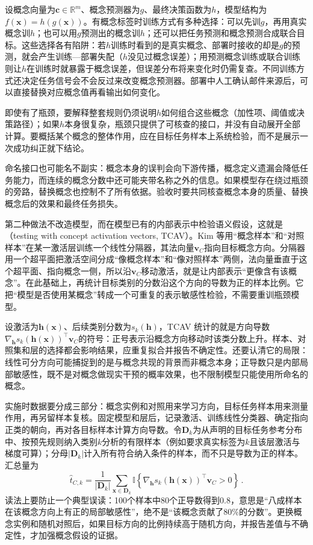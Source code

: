设概念向量为$\bm c\in\mathbb R^m$、概念预测器为$g$、最终决策函数为$h$，模型结构为$f(\bm x)=h(g(\bm x))$。有概念标签时训练方式有多种选择：可以先训$g$，再用真实概念训$h$；也可以用$g$预测出的概念训$h$；还可以把任务预测和概念预测合成联合目标。这些选择各有陷阱：若$h$训练时看到的是真实概念、部署时接收的却是$g$的预测，就会产生训练—部署失配（$h$没见过概念误差）；用预测概念训练或联合训练则让$h$在训练时就暴露于概念误差，但误差分布将来变化时仍需复查。不同训练方式还决定任务信号会不会反过来改变概念预测器。部署中人工确认邮件来源后，可以直接替换对应概念值再看输出如何变化。

即使有了瓶颈，要解释整套规则仍须说明$h$如何组合这些概念（加性项、阈值或决策路径）；如果$h$本身很复杂，瓶颈只提供了可核查的接口，并没有自动展开全部计算。要概括某个概念的整体作用，应在目标任务样本上系统检验，而不是展示一次成功纠正就下结论。

命名接口也可能名不副实：概念本身的误判会向下游传播，概念定义遗漏会降低任务能力，而连续的概念分数中还可能夹带名称之外的信息。如果模型存在绕过瓶颈的旁路，替换概念也控制不了所有依据。验收时要共同核查概念本身的质量、替换概念后的效果和最终任务损失。

第二种做法不改造模型，而在模型已有的内部表示中检验语义假设，这就是（testing with concept activation vectors, TCAV）。Kim 等用“概念样本”和“对照样本”在某一激活层训练一个线性分隔器，其法向量$\bm v_C$指向目标概念方向。分隔器用一个超平面把激活空间分成“像概念样本”和“像对照样本”两侧，法向量垂直于这个超平面、指向概念一侧，所以沿$\bm v_C$移动激活，就是让内部表示“更像含有该概念”。在此基础上，再统计目标类别的分数沿这个方向的导数为正的样本比例。它把“模型是否使用某概念”转成一个可重复的表示敏感性检验，不需要重训瓶颈模型。

设激活为$\bm h(\bm x)$、后续类别分数为$s_k(\bm h)$，TCAV 统计的就是方向导数$\nabla_{\bm h}s_k(\bm h(\bm x))^\top\bm v_C$的符号：正号表示沿概念方向移动时该类分数上升。样本、对照集和层的选择都会影响结果，应重复拟合并报告不确定性。还要认清它的局限：线性可分方向可能捕捉到的是与概念共现的背景而非概念本身；正导数只是内部局部敏感性，既不是对概念做现实干预的概率效果，也不限制模型只能使用所命名的概念。

实施时数据要分成三部分：概念实例和对照用来学习方向，目标任务样本用来测量作用，再另留样本复核。固定模型和层后，记录激活、训练线性分类器、确定指向正类的朝向，再对各目标样本计算方向导数。令$\bm D_k$为从声明的目标任务参考分布中、按预先规则纳入类别$k$分析的有限样本（例如要求真实标签为$k$且该层激活与梯度可算）；分母$|\bm D_k|$计入所有符合纳入条件的样本，而不只是导数为正的样本。汇总量为
\[
 \widehat t_{C,k}
 =\frac1{|\bm D_k|}\sum_{\bm{x}\in\bm D_k}
 \mathbb I\!\left\{
 \nabla_{\bm h}s_k(\bm h(\bm{x}))^\top\bm v_C>0
 \right\}\, .
\]
读法上要防止一个典型误读：100个样本中80个正导数得到0.8，意思是“八成样本在该概念方向上有正的局部敏感性”，绝不是“该概念贡献了80\%的分数”。更换概念实例和随机对照后，如果目标方向的比例持续高于随机方向，并报告差值与不确定性，才加强概念假设的证据。


